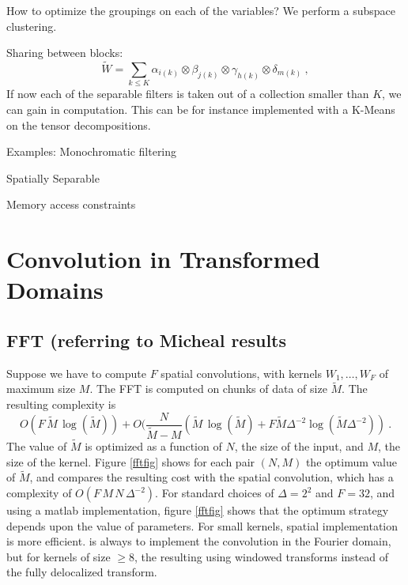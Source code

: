 \documentclass{article}
\begin{document}
 How to optimize the groupings on each of the variables? We perform a subspace clustering. 
 
 
 Sharing between blocks: 
\begin{equation}
\label{rankoptim}
 \widetilde{W} = \sum_{k\leq K} \alpha_{i(k)} \otimes \beta_{j(k)} \otimes \gamma_{h(k)} \otimes \delta_{m(k)}~,
\end{equation}
If now each of the separable filters is taken out of a collection smaller than $K$, we can gain 
in computation. This can be for instance implemented with a K-Means on the tensor decompositions.


Examples:
Monochromatic filtering

Spatially Separable

Memory access constraints

\section{Convolution in Transformed Domains}

\subsection{FFT (referring to Micheal results}

Suppose we have to compute $F$ spatial convolutions, 
with kernels $W_1,\dots,W_F$ of maximum size $M$.
The FFT is computed on chunks of data 
of size $\tilde{M}$.
 The resulting complexity is 
$$O(F\, \tilde{M}\, \log(\tilde{M})) + O( \frac{N}{\tilde{M} - M} ( \tilde{M}\, \log(\tilde{M}) + F \tilde{M} \Delta^{-2} \log(\tilde{M} \Delta^{-2}) )~.$$
The value of $\tilde{M}$ is optimized as a function of $N$, the size of the input, 
and $M$, the size of the kernel. Figure \ref{fftfig} shows for each pair $(N,M)$ the 
optimum value of $\tilde{M}$, and compares the resulting cost 
with the spatial convolution, which has a complexity of $O(F \, M \, N\, \Delta^{-2})$.
 For standard choices of $\Delta=2^2$ and $F=32$, 
and using a matlab implementation, figure \ref{fftfig} 
shows that the optimum 
strategy depends upon the value of parameters. For small kernels, 
spatial implementation is more efficient. 
is always to implement the convolution in the Fourier domain, but
for kernels of size $\geq 8$, the resulting 
using windowed transforms instead of the fully delocalized transform.
\end{document}
